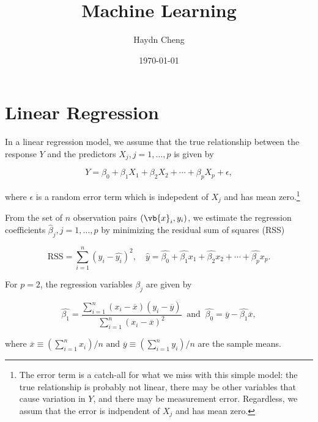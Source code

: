 \documentclass[english,a4paper,12pt]{report}
\title{Machine Learning}
\author{Haydn Cheng}
\date{\today}
\begin{document}
\maketitle
\tableofcontents
    
\chapter{Linear Regression}

In a linear regression model, we assume that the true relationship between the response \(Y\) and the predictors \(X_{j}, j= 1, \ldots ,p \) is given by 

\begin{equation}
    Y = \beta _{0} + \beta _{1} X_1 + \beta _{2} X_2 + \cdots + \beta _{p} X_{p} + \epsilon ,
\end{equation}

where \(\epsilon \) is a random error term which is indepedent of \(X_{j} \) and has mean zero.\footnote{The error term is a catch-all for what we miss with this simple model: the true relationship is probably not linear, there may be other variables that cause variation in \(Y\), and there may be measurement error. Regardless, we assum that the error is indpendent of \(X_{j} \) and has mean zero.} 

From the set of \(n\) observation pairs \((\vb{x} _{i}, y_{i} )\), we estimate the regression coefficients \(\hat{\beta }_{j}, j= 1,\ldots ,p\) by minimizing the residual sum of squares (RSS)  

\begin{equation}
    \text{RSS} = \sum_{i=1}^{n} (y_{i} - \hat{y_{i} } )^2, \quad \hat{y} = \hat{\beta _{0} } + \hat{\beta _{1} }x_1 + \hat{\beta _{2} }x_2 + \cdots + \hat{\beta _{p} }x_{p}.    
\end{equation}

For \(p = 2\), the regression variables \(\beta _{j} \) are given by 

\begin{equation}
    \hat{\beta _{1} } = \frac{\sum_{i=1}^{n} (x_{i} - \overline{x} )(y_{i} - \overline{y} )}{\sum_{i=1}^{n} (x_{i} - \overline{x} )^2} ~\text { and }~ \hat{\beta _{0} } = \overline{y} - \hat{\beta _{1} }\overline{x}, 
\end{equation}

where \(\overline{x} \equiv (\sum_{i=1}^{n} x_{i}) /n \text { and } \overline{y} \equiv (\sum_{i=1}^{n} y_{i} ) /n\) are the sample means. 
\end{document}

